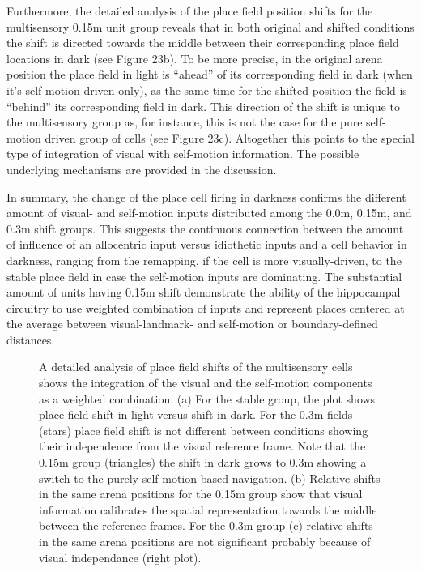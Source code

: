 Furthermore, the detailed analysis of the place field position shifts for the multisensory 0.15m unit group reveals that in both original and shifted conditions the shift is directed towards the middle between their corresponding place field locations in dark (see Figure 23b). To be more precise, in the original arena position the place field in light is “ahead” of its corresponding field in dark (when it’s self-motion driven only), as the same time for the shifted position the field is “behind” its corresponding field in dark. This direction of the shift is unique to the multisensory group as, for instance, this is not the case for the pure self-motion driven group of cells (see Figure 23c). Altogether this points to the special type of integration of visual with self-motion information. The possible underlying mechanisms are provided in the discussion.

In summary, the change of the place cell firing in darkness confirms the different amount of visual- and self-motion inputs distributed among the 0.0m, 0.15m, and 0.3m shift groups. This suggests the continuous connection between the amount of influence of an allocentric input versus idiothetic inputs and a cell behavior in darkness, ranging from the remapping, if the cell is more visually-driven, to the stable place field in case the self-motion inputs are dominating. The substantial amount of units having 0.15m shift demonstrate the ability of the hippocampal circuitry to use weighted combination of inputs and represent places centered at the average between visual-landmark- and self-motion or boundary-defined distances.

\begin{figure}
\captionsetup{format=plain}
\caption[Weigthed combination of the inputs]{
A detailed analysis of place field shifts of the multisensory cells shows the integration of the visual and the self-motion components as a weighted combination. (a) For the stable group, the plot shows place field shift in light versus shift in dark. For the 0.3m fields (stars) place field shift is not different between conditions showing their independence from the visual reference frame. Note that the 0.15m group (triangles) the shift in dark grows to 0.3m showing a switch to the purely self-motion based navigation. (b) Relative shifts in the same arena positions for the 0.15m group show that visual information calibrates the spatial representation towards the middle between the reference frames. For the 0.3m group (c) relative shifts in the same arena positions are not significant probably because of visual independance (right plot).
}
\label{fig:F23_shift_to_middle}
\end{figure}


